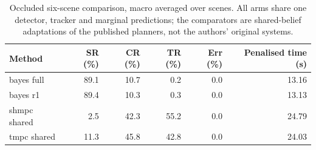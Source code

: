 \begin{table}[t]
\centering
\caption{Occluded six-scene comparison, macro averaged over scenes. All arms share one detector, tracker and marginal predictions; the comparators are shared-belief adaptations of the published planners, not the authors' original systems.}
\label{tab:main_occlusion}
\small
\begin{tabular}{lrrrrr}
\toprule
Method & SR (\%) & CR (\%) & TR (\%) & Err (\%) & Penalised time (s) \\
\midrule
bayes full & 89.1 & 10.7 & 0.2 & 0.0 & 13.16 \\
bayes r1 & 89.4 & 10.3 & 0.3 & 0.0 & 13.13 \\
shmpc shared & 2.5 & 42.3 & 55.2 & 0.0 & 24.79 \\
tmpc shared & 11.3 & 45.8 & 42.8 & 0.0 & 24.03 \\
\bottomrule
\end{tabular}
\end{table}
